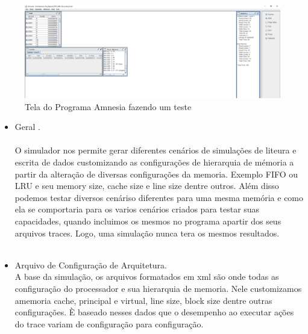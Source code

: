 \documentclass[conference]{IEEEtran}
\begin{document}
\begin{figure}
  \includegraphics[width=\linewidth]{Amnesia_screen.png}
  \caption{Tela do Programa Amnesia fazendo um teste}
  \label{fig:boat1}
\end{figure}

\begin{itemize}
\item  
Geral . \\ \\
O simulador nos permite gerar diferentes cenários de simulações de liteura e escrita de dados
customizando as configurações de hierarquia de mémoria a partir da alteração de diversas configurações da memoria. Exemplo FIFO ou LRU e seu memory size, cache size e line size dentre outros. Além disso podemos testar diversos cenáriso diferentes para uma mesma memória e como ela se comportaria para os varios cenários criados para testar suas capacidades, quando incluimos os mesmos no programa apartir dos seus arquivos traces. Logo, uma simulação nunca tera os mesmos resultados.\\
\\

\item Arquivo de Configuração de Arquitetura. \\
A base da simulação, os arquivos formatados em xml são onde todas as configuração do processador e sua hierarquia de memoria. Nele customizamos amemoria cache, principal e virtual, line size, block size dentre outras configurações. È baseado nesses dados que o desempenho ao executar ações do trace variam de configuração para configuração.
\\


\end{itemize}
\end{document}
